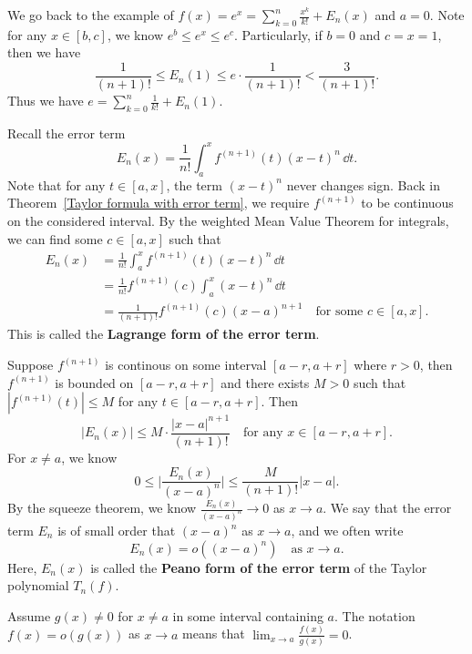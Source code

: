         \begin{exampleenv}
            We go back to the example of $\displaystyle f(x) = e^x=\sum_{k=0}^n \frac{x^k}{k!} + E_n(x)$ and $a=0$. Note for any $x\in [b,c]$, we know $e^b \le e^x \le e^c$. Particularly, if $b=0$ and $c=x=1$, then we have
            \[
            \frac{1}{(n+1)!} \le E_n(1) \le e\cdot \frac{1}{(n+1)!} < \frac{3}{(n+1)!}.
            \]
            Thus we have $\displaystyle e=\sum_{k=0}^n \frac{1}{k!} + E_n(1)$.
        \end{exampleenv}
        \begin{remarkenv}
            Recall the error term
            \[
            E_n(x) = \frac{1}{n!} \int_a^x f^{(n+1)}(t) (x-t)^n\, \dd t.
            \]
            Note that for any $t\in [a,x]$, the term $(x-t)^n$ never changes sign. Back in Theorem~\ref{Taylor formula with error term}, we require $f^{(n+1)}$ to be continuous on the considered interval. By the weighted Mean Value Theorem for integrals, we can find some $c\in [a,x]$ such that
            \[
            \begin{aligned}
                E_n(x) &= \frac{1}{n!} \int_a^x f^{(n+1)}(t) (x-t)^n\, \dd t\\
                &= \frac{1}{n!} f^{(n+1)}(c) \int_a^x (x-t)^n\, \dd t\\
                &= \frac{1}{(n+1)!} f^{(n+1)}(c) (x-a)^{n+1}\quad \text{for some } c\in [a,x].
            \end{aligned}
            \]
            This is called the \textbf{Lagrange form of the error term}.

            Suppose $f^{(n+1)}$ is continous on some interval $[a-r,a+r]$ where $r>0$, then $f^{(n+1)}$ is bounded on $[a-r,a+r]$ and there exists $M>0$ such that $|f^{(n+1)}(t)| \le M$ for any $t\in [a-r,a+r]$. Then
            \[
            |E_n(x)| \le M \cdot \frac{|x-a|^{n+1}}{(n+1)!} \quad \text{for any } x\in [a-r,a+r].
            \]
            For $x\neq a$, we know $$0 \le \big|\frac{E_n(x)}{(x-a)^{n}}\big| \le \frac{M}{(n+1)!}|x-a|.$$ By the squeeze theorem, we know $\displaystyle \frac{E_n(x)}{(x-a)^{n}} \to 0$ as $x \to a$. We say that the error term $E_n$ is of small order that $(x-a)^n$ as $x\to a$, and we often write $$E_n(x) = o\left( (x-a)^n \right) \quad \text{as } x\to a.$$
            Here, $E_n(x)$ is called the \textbf{Peano form of the error term} of the Taylor polynomial $T_n(f)$.
        \end{remarkenv}
        \begin{definitionenv}
            Assume $g(x)\neq 0$ for $x\neq a$ in some interval containing $a$. The notation $f(x) = o(g(x))$ as $x\to a$ means that $\displaystyle \lim_{x\to a} \frac{f(x)}{g(x)} = 0$.
        \end{definitionenv}

